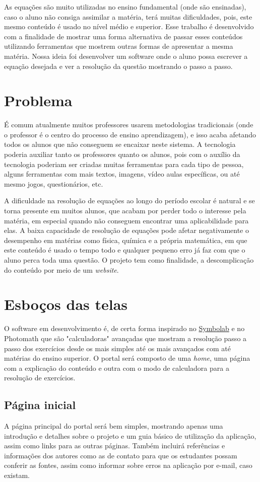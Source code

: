 \documentclass[12pt]{report}
\begin{document}
As equações são muito utilizadas no ensino fundamental (onde são ensinadas), caso o aluno não consiga assimilar a matéria, terá muitas dificuldades, pois, este mesmo conteúdo é usado no  nível médio e superior. Esse trabalho é desenvolvido com a finalidade de mostrar uma forma alternativa de passar esses conteúdos utilizando ferramentas que mostrem outras formas de apresentar a mesma matéria. Nossa ideia foi desenvolver um software onde o aluno possa escrever a equação desejada e ver a resolução da questão mostrando o passo a passo. 

\chapter{Problema}
É  comum atualmente muitos professores usarem metodologias tradicionais (onde o professor é o centro do processo de ensino aprendizagem), e isso acaba afetando todos os alunos que não conseguem se encaixar neste sistema. A tecnologia poderia auxiliar tanto os professores quanto os alunos, pois com o auxílio da tecnologia poderiam ser criadas muitas ferramentas para cada tipo de pessoa, alguns ferramentas com mais textos, imagens, vídeo aulas específicas, ou até mesmo jogos, questionários, etc.

A dificuldade na resolução de equações ao longo do período escolar é natural e se torna presente em muitos alunos, que acabam por perder todo o interesse pela matéria, em especial quando não conseguem encontrar uma aplicabilidade para elas. A baixa capacidade de resolução de equações pode afetar negativamente o desempenho em matérias como física, química e a própria matemática, em que este conteúdo é usado o tempo todo e qualquer pequeno erro já faz com que o aluno perca toda uma questão. O projeto tem como finalidade, a descomplicação do conteúdo por meio de um \textit{website}.

\chapter{Esboços das telas}
O software em desenvolvimento é, de certa forma inspirado no \href{https://pt.symbolab.com/}{Symbolab} e no Photomath que são "calculadoras" avançadas que mostram a resolução passo a passo dos exercícios desde os mais simples até os mais avançados com até matérias do ensino superior. O portal será composto de uma \textit{home}, uma página com a explicação do conteúdo e outra com o modo de calculadora para a resolução de exercícios.

\section{Página inicial}
A página principal do portal será bem simples, mostrando apenas uma introdução e detalhes sobre o projeto e um guia básico de utilização da aplicação, assim como links para as outras páginas. Também incluirá referências e informações dos autores como as de contato para que os estudantes possam conferir as fontes, assim como informar sobre erros na aplicação por e-mail, caso existam.
\end{document}
